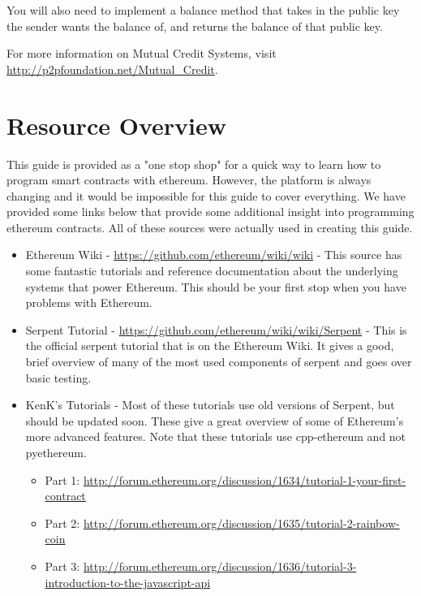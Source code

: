 \documentclass[12pt]{article}
\begin{document}
You will also need to implement a balance method that takes in the public key the sender wants the balance of, and returns the balance of that public key.

For more information on Mutual Credit Systems, visit \url{http://p2pfoundation.net/Mutual_Credit}.



\section{Resource Overview}

This guide is provided as a "one stop shop" for a quick way to learn how to program smart contracts with ethereum. However, the platform is always changing and it would be impossible for this guide to cover everything. We have provided some links below that provide some additional insight into programming ethereum contracts. All of these sources were actually used in creating this guide. 

\begin{itemize}
	\item Ethereum Wiki - \url{https://github.com/ethereum/wiki/wiki} - This source has some fantastic tutorials and reference documentation about the underlying systems that power Ethereum. This should be your first stop when you have problems with Ethereum.
	\item Serpent Tutorial - \url{https://github.com/ethereum/wiki/wiki/Serpent} - This is the official serpent tutorial that is on the Ethereum Wiki. It gives a good, brief overview of many of the most used components of serpent and goes over basic testing.
	\item KenK's Tutorials - Most of these tutorials use old versions of Serpent, but should be updated soon. These give a great overview of some of Ethereum's more advanced features. Note that these tutorials use cpp-ethereum and not pyethereum.
	\begin{itemize}
	\item Part 1: \url{http://forum.ethereum.org/discussion/1634/tutorial-1-your-first-contract}
	\item Part 2: \url{http://forum.ethereum.org/discussion/1635/tutorial-2-rainbow-coin}
	\item Part 3: \url{http://forum.ethereum.org/discussion/1636/tutorial-3-introduction-to-the-javascript-api}
	\end{itemize}
\end{itemize}



\end{document}

